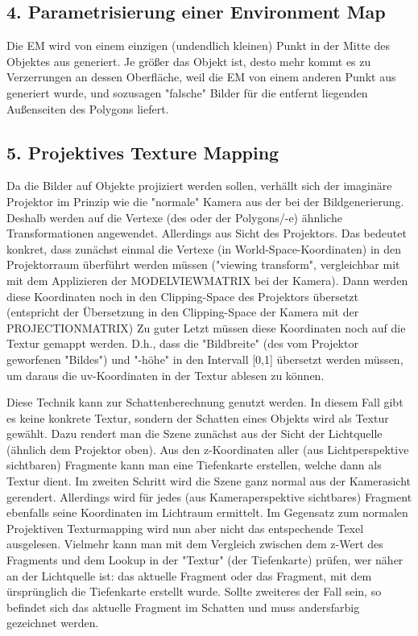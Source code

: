 \documentclass[a4paper,headings=small]{scrartcl}
\numberwithin{equation}{section} %
\numberwithin{figure}{section}   %
\begin{document}
\subsection*{4. Parametrisierung einer Environment Map}
Die EM wird von einem einzigen (undendlich kleinen) Punkt in der Mitte des Objektes aus generiert.
Je größer das Objekt ist, desto mehr kommt es zu Verzerrungen an dessen Oberfläche,
weil die EM von einem anderen Punkt aus generiert wurde,
und sozusagen "falsche" Bilder für die entfernt liegenden Außenseiten des Polygons liefert.

\subsection*{5. Projektives Texture Mapping}
Da die Bilder auf Objekte projiziert werden sollen, verhällt sich der imaginäre Projektor im Prinzip wie die "normale" Kamera aus der bei der Bildgenerierung.
Deshalb werden auf die Vertexe (des oder der Polygons/-e) ähnliche Transformationen angewendet.
Allerdings aus Sicht des Projektors.
Das bedeutet konkret, dass zunächst einmal die Vertexe (in World-Space-Koordinaten) in den Projektorraum überführt werden müssen ("viewing transform", vergleichbar mit mit dem Applizieren der MODELVIEWMATRIX bei der Kamera).
Dann werden diese Koordinaten noch in den Clipping-Space des Projektors übersetzt (entspricht der Übersetzung in den Clipping-Space der Kamera mit der PROJECTIONMATRIX)
Zu guter Letzt müssen diese Koordinaten noch auf die Textur gemappt werden.
D.h., dass die "Bildbreite" (des vom Projektor geworfenen "Bildes") und "-höhe" in den Intervall [0,1] übersetzt werden müssen, um daraus die uv-Koordinaten in der Textur ablesen zu können.

Diese Technik kann zur Schattenberechnung genutzt werden. In diesem Fall gibt es keine konkrete Textur, sondern der Schatten eines Objekts wird als Textur gewählt.
Dazu rendert man die Szene zunächst aus der Sicht der Lichtquelle (ähnlich dem Projektor oben).
Aus den z-Koordinaten aller (aus Lichtperspektive sichtbaren) Fragmente kann man eine Tiefenkarte erstellen, welche dann als Textur dient.
Im zweiten Schritt wird die Szene ganz normal aus der Kamerasicht gerendert.
Allerdings wird für jedes (aus Kameraperspektive sichtbares) Fragment ebenfalls seine Koordinaten im Lichtraum ermittelt.
Im Gegensatz zum normalen Projektiven Texturmapping wird nun aber nicht das entspechende Texel ausgelesen.
Vielmehr kann man mit dem Vergleich zwischen dem z-Wert des Fragments und dem Lookup in der "Textur" (der Tiefenkarte) prüfen, wer näher an der Lichtquelle ist: das aktuelle Fragment oder das Fragment, mit dem ürsprünglich die Tiefenkarte erstellt wurde. Sollte zweiteres der Fall sein, so befindet sich das aktuelle Fragment im Schatten und muss andersfarbig gezeichnet werden.
\end{document}
